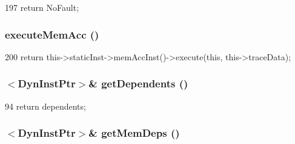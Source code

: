 \begin{DoxyCode}
197     { return NoFault; }
\end{DoxyCode}
\hypertarget{classOzoneDynInst_a7a38dfec007f2f9e9c75fbccc117b256}{
\subsubsection[{executeMemAcc}]{ executeMemAcc ()}}
\label{classOzoneDynInst_a7a38dfec007f2f9e9c75fbccc117b256}



\begin{DoxyCode}
200     { return this->staticInst->memAccInst()->execute(this, this->traceData); }
\end{DoxyCode}
\hypertarget{classOzoneDynInst_a26eb9ab258ccdd0e4a62062b6bc50446}{
\subsubsection[{getDependents}]{$<${\bf DynInstPtr}$>$\& getDependents ()}}
\label{classOzoneDynInst_a26eb9ab258ccdd0e4a62062b6bc50446}



\begin{DoxyCode}
94 { return dependents; }
\end{DoxyCode}
\hypertarget{classOzoneDynInst_a912e35c4a6671a919053a95cce3e063a}{
\subsubsection[{getMemDeps}]{$<${\bf DynInstPtr}$>$\& getMemDeps ()}}
\label{classOzoneDynInst_a912e35c4a6671a919053a95cce3e063a}



